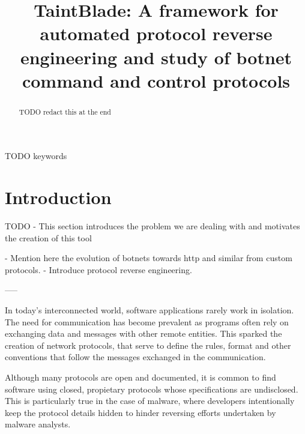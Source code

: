 \documentclass[conference]{IEEEtran}
\begin{document}
\title{TaintBlade: A framework for automated protocol reverse engineering and study of botnet command and control protocols
}

\author{
    \and
}

\maketitle

\begin{abstract}
    TODO redact this at the end
\end{abstract}

\begin{IEEEkeywords}
    TODO keywords
\end{IEEEkeywords}

\section{Introduction}
TODO - This section introduces the problem we are dealing with and motivates
the creation of this tool

- Mention here the evolution of botnets towards http and similar from custom protocols.
- Introduce protocol reverse engineering.

-----

In today's interconnected world, software applications rarely work in
isolation. The need for communication has become prevalent as programs often
rely on exchanging data and messages with other remote entities. This sparked
the creation of network protocols, that serve to define the rules, format and
other conventions that follow the messages exchanged in the communication.

Although many protocols are open and documented, it is common to find software
using closed, propietary protocols whose specifications are undisclosed. This
is particularly true in the case of malware, where developers intentionally
keep the protocol details hidden to hinder reversing efforts undertaken by
malware analysts.
\end{document}
